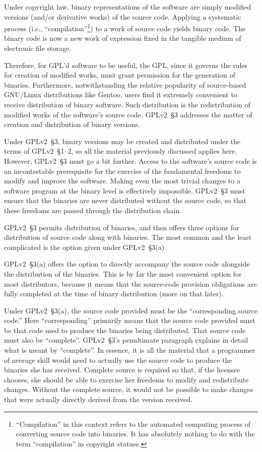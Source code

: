 Under copyright law, binary representations of the software are simply
modified versions (and/or derivative works) of the source code.  Applying a systematic process (i.e.,
``compilation''\footnote{``Compilation'' in this context refers to the
  automated computing process of converting source code into binaries.  It
  has absolutely nothing to do with the term ``compilation'' in copyright statues.}) to a work of source code yields binary code. The binary
code is now a new work of expression fixed in the tangible medium of
electronic file storage.

Therefore, for GPL'd software to be useful, the GPL, since it governs the
rules for creation of modified works, must grant permission for the
generation of binaries.  Furthermore, notwithstanding the relative
popularity of source-based GNU/Linux distributions like Gentoo, users find
it extremely convenient to receive distribution of binary software.  Such
distribution is the redistribution of modified works of the software's
source code.  GPLv2~\S3 addresses the matter of creation and distribution of
binary versions.

Under GPLv2~\S3, binary versions may be created and distributed under the
terms of GPLv2~\S1--2, so all the material previously discussed applies
here.  However, GPLv2~\S3 must go a bit further.  Access to the software's
source code is an incontestable prerequisite for the exercise of the
fundamental freedoms to modify and improve the software.  Making even
the most trivial changes to a software program at the binary level is
effectively impossible.  GPLv2~\S3 must ensure that the binaries are never
distributed without the source code, so that these freedoms are passed
through the distribution chain.

GPLv2~\S3 permits distribution of binaries, and then offers three options for
distribution of source code along with binaries. The most common and the
least complicated is the option given under GPLv2~\S3(a).

\label{GPLv2s3a}
GPLv2~\S3(a) offers the option to directly accompany the source code alongside
the distribution of the binaries.  This is by far the most convenient
option for most distributors, because it means that the source-code
provision obligations are fully completed at the time of binary
distribution (more on that later).

Under GPLv2~\S3(a), the source code provided must be the ``corresponding source
code.''  Here ``corresponding'' primarily means that the source code
provided must be that code used to produce the binaries being distributed.
That source code must also be ``complete''.   GPLv2~\S3's penultimate paragraph
explains in detail what is meant by ``complete''.  In essence, it is all
the material that a programmer of average skill would need to actually use
the source code to produce the binaries she has received.  Complete source
is required so that, if the licensee chooses, she should be able to
exercise her freedoms to modify and redistribute changes.  Without the
complete source, it would not be possible to make changes that were
actually directly derived from the version received.

